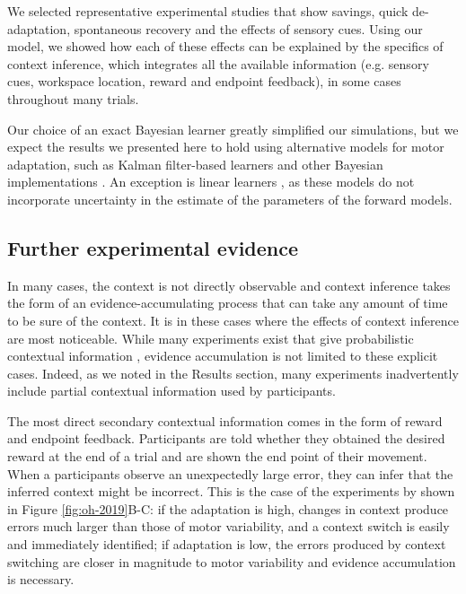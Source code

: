 \documentclass[a4paper,doc,floatsintext,natbib]{apa6}%
\def \fref #1{Figure \ref{#1}}     %
\begin{document}
We selected representative experimental studies that show savings, quick de-adaptation, spontaneous recovery and the effects of sensory cues. Using our model, we showed how each of these effects can be explained by the specifics of context inference, which integrates all the available information (e.g. sensory cues, workspace location, reward and endpoint feedback), in some cases throughout many trials.

Our choice of an exact Bayesian learner greatly simplified our simulations, but we expect the results we presented here to hold using alternative models for motor adaptation, such as Kalman filter-based learners \cite[e.g.][]{Oh_Minimizing_2019,Baddeley_System_2003} and other Bayesian implementations \cite[e.g.][]{Wolpert_Multiple_1998,Kording_Bayesian_2004}. An exception is linear learners \cite[e.g.][]{Smith_Interacting_2006,Forano_Timescales_2020,Lee_Dual_2009}, as these models do not incorporate uncertainty in the estimate of the parameters of the forward models.

\subsection{Further experimental evidence}
In many cases, the context is not directly observable and context inference takes the form of an evidence-accumulating process that can take any amount of time to be sure of the context. It is in these cases where the effects of context inference are most noticeable. While many experiments exist that give probabilistic contextual information \cite[e.g.][]{Scholz_uncontrolled_1999,Behrens_Learning_2007,Nassar_Dissociable_2019}, evidence accumulation is not limited to these explicit cases. Indeed, as we noted in the Results section, many experiments inadvertently include partial contextual information used by participants.

The most direct secondary contextual information comes in the form of reward and endpoint feedback. Participants are told whether they obtained the desired reward at the end of a trial and are shown the end point of their movement. When a participants observe an unexpectedly large error, they can infer that the inferred context might be incorrect. This is the case of the experiments by \cite{Oh_Minimizing_2019} shown in \fref{fig:oh-2019}B-C: if the adaptation is high, changes in context produce errors much larger than those of motor variability, and a context switch is easily and immediately identified; if adaptation is low, the errors produced by context switching are closer in magnitude to motor variability and evidence accumulation is necessary.
\end{document}
